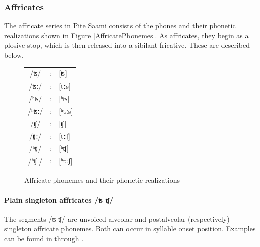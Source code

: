 \subsubsection{Affricates}\label{Affricates}
The affricate series in Pite Saami consists of the phones and their phonetic realizations shown in Figure \vref{AffricatePhonemes}. As affricates, they begin as a plosive stop, which is then released into a sibilant fricative. %
These are described below.
\begin{figure}\centering
\begin{tabular}{c c l}
/ʦ/ &:& [ʦ] \\ %
/ʦː/ &:& [tːs] \\ %
/ʰʦ/ &:& [ʰʦ] \\ %
/ʰʦː/ &:& [ʰtːs] \\ %
/ʧ/ &:& [ʧ] \\ %
/ʧː/ &:& [tːʃ] \\ %
/ʰʧ/ &:& [ʰʧ] \\ %
/ʰʧː/ &:& [ʰtːʃ] \\ %
\end{tabular}
\caption{Affricate phonemes and their phonetic realizations}\label{AffricatePhonemes}
\end{figure}

\paragraph{Plain singleton affricates /ʦ ʧ/}\label{tstj}
The segments /ʦ ʧ/ are unvoiced alveolar and postalveolar (respectively) singleton affricate phonemes. Both can occur in syllable onset position. Examples can be found in  through .

